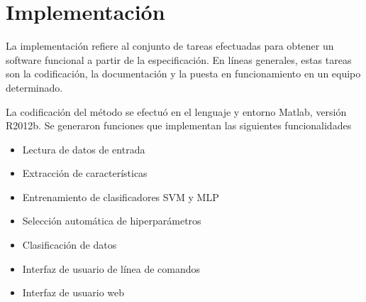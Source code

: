 \chapter{Implementación}
La implementación refiere al conjunto de tareas efectuadas para
obtener un software funcional a partir de la especificación. En líneas
generales, estas tareas son la codificación, la documentación y la
puesta en funcionamiento en un equipo determinado.

La codificación del método se efectuó en el lenguaje y entorno Matlab,
versión R2012b. Se generaron funciones que implementan las siguientes
funcionalidades

\begin{itemize}
\item Lectura de datos de entrada
\item Extracción de características
\item Entrenamiento de clasificadores SVM y MLP
\item Selección automática de hiperparámetros
\item Clasificación de datos
\item Interfaz de usuario de línea de comandos
\item Interfaz de usuario web
\end{itemize}
